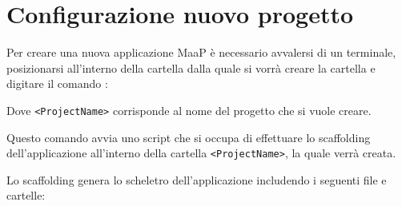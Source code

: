 \section{Configurazione nuovo progetto}

Per creare una nuova applicazione MaaP è necessario avvalersi di un terminale, posizionarsi all'interno della cartella dalla quale si vorrà creare la cartella e digitare il comando :
\\ \centerline{  }
Dove \texttt{<ProjectName>} corrisponde al nome del progetto che si vuole creare.

Questo comando avvia uno script che si occupa di effettuare lo scaffolding dell'applicazione all'interno della cartella \texttt{<ProjectName>}, la quale verrà creata.

Lo scaffolding genera lo scheletro dell'applicazione includendo i seguenti file e cartelle: 
